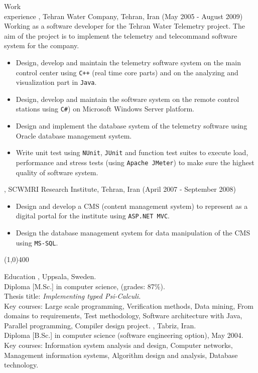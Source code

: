 \documentclass{resume}
\begin{document}
\begin{category}{Work \\experience}
, Tehran Water Company, Tehran, Iran (May 2005 - August 2009)\\
Working as a software developer for the Tehran Water Telemetry project. The aim of the 
project is to implement the telemetry and telecommand software system for the company.
\begin{itemize}
 \item Design, develop and maintain the telemetry software system on the main control center using 
       \texttt{C++} (real time core parts) and on the analyzing and visualization part in \texttt{Java}.
 \item Design, develop and maintain the software system on the remote control stations using \texttt{C\#})
       on Microsoft Windows Server platform.
 \item Design and implement the database system of the telemetry software 
       using Oracle database management system.
 \item Write unit test using \texttt{NUnit}, \texttt{JUnit} and function test 
       suites to execute load, performance and stress tests (using \texttt{Apache JMeter}) 
       to make sure the highest quality of software system. 
\end{itemize}

, SCWMRI Research Institute, 
Tehran, Iran (April 2007 - September 2008)
\begin{itemize} 
\item Design and develop a CMS (content management system) to represent as a 
      digital portal for the institute using \texttt{ASP.NET MVC}.
\item Design the database management system for data manipulation of the CMS using \texttt{MS-SQL}.
\end{itemize}

\end{category}

\begin{center}
\line(1,0){400}
\end{center}

\begin{category}{Education}
, Uppsala, Sweden. \\
Diploma [M.Sc.] in computer science, (grades: 87\%).\\
Thesis title: {\em Implementing typed Psi-Calculi.}\\
Key courses: Large scale programming, Verification methods, Data mining, 
From domains to requirements, Test methodology,
Software architecture with Java, Parallel programming, Compiler design project. 
, Tabriz, Iran.\\
Diploma [B.Sc.] in computer science (software engineering option), May 2004.\\
Key courses: Information system analysis and design, Computer networks, 
Management information systems, Algorithm design and analysis, Database technology.

\end{category}
\end{document}
